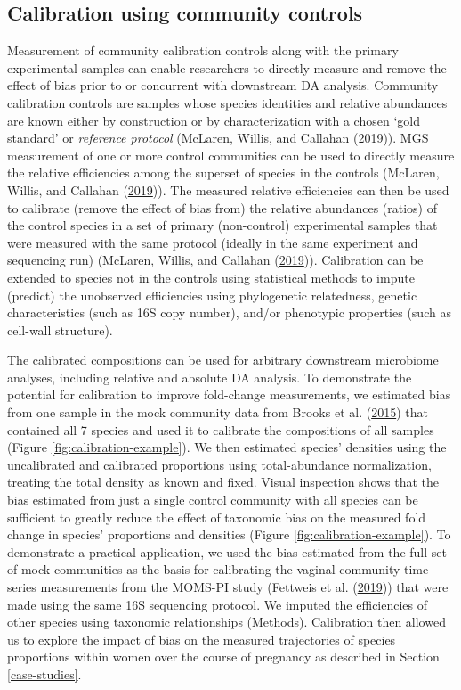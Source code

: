 \documentclass[
]{article}
\begin{document}
\hypertarget{calibrate-compositions}{%
\subsection{Calibration using community controls}\label{calibrate-compositions}}

Measurement of community calibration controls along with the primary experimental samples can enable researchers to directly measure and remove the effect of bias prior to or concurrent with downstream DA analysis.
Community calibration controls are samples whose species identities and relative abundances are known either by construction or by characterization with a chosen `gold standard' or \emph{reference protocol} (McLaren, Willis, and Callahan (\protect\hyperlink{ref-mclaren2019cons}{2019})).
MGS measurement of one or more control communities can be used to directly measure the relative efficiencies among the superset of species in the controls (McLaren, Willis, and Callahan (\protect\hyperlink{ref-mclaren2019cons}{2019})).
The measured relative efficiencies can then be used to calibrate (remove the effect of bias from) the relative abundances (ratios) of the control species in a set of primary (non-control) experimental samples that were measured with the same protocol (ideally in the same experiment and sequencing run) (McLaren, Willis, and Callahan (\protect\hyperlink{ref-mclaren2019cons}{2019})).
Calibration can be extended to species not in the controls using statistical methods to impute (predict) the unobserved efficiencies using phylogenetic relatedness, genetic characteristics (such as 16S copy number), and/or phenotypic properties (such as cell-wall structure).

The calibrated compositions can be used for arbitrary downstream microbiome analyses, including relative and absolute DA analysis.
To demonstrate the potential for calibration to improve fold-change measurements, we estimated bias from one sample in the mock community data from Brooks et al. (\protect\hyperlink{ref-brooks2015thet}{2015}) that contained all 7 species and used it to calibrate the compositions of all samples (Figure \ref{fig:calibration-example}).
We then estimated species' densities using the uncalibrated and calibrated proportions using total-abundance normalization, treating the total density as known and fixed.
Visual inspection shows that the bias estimated from just a single control community with all species can be sufficient to greatly reduce the effect of taxonomic bias on the measured fold change in species' proportions and densities (Figure \ref{fig:calibration-example}).
To demonstrate a practical application, we used the bias estimated from the full set of mock communities as the basis for calibrating the vaginal community time series measurements from the MOMS-PI study (Fettweis et al. (\protect\hyperlink{ref-fettweis2019thev}{2019})) that were made using the same 16S sequencing protocol.
We imputed the efficiencies of other species using taxonomic relationships (Methods).
Calibration then allowed us to explore the impact of bias on the measured trajectories of species proportions within women over the course of pregnancy as described in Section \ref{case-studies}.
\end{document}
